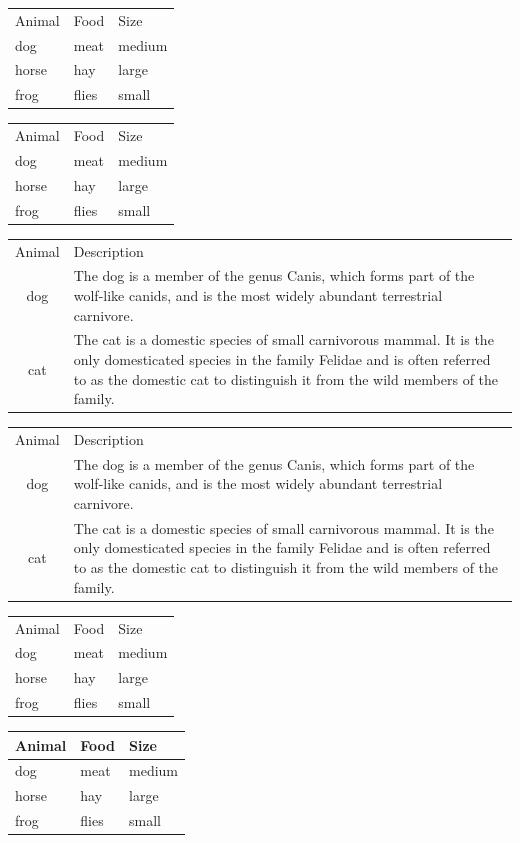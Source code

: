 \documentclass{article}
\begin{document}
\begin{tabular}{lll}
Animal & Food & Size \\
dog & meat & medium \\
horse & hay & large \\
frog & flies & small \\
\end{tabular}

\begin{tabular}{lBl}
Animal & Food & Size \\
dog & meat & medium \\
horse & hay & large \\
frog & flies & small \\
\end{tabular}

\begin{tabular}{cl}
Animal & Description \\
dog & The dog is a member of the genus Canis, which forms
part of the wolf-like canids, and is the most widely abundant
terrestrial carnivore. \\
cat & The cat is a domestic species of small carnivorous
mammal. It is the only domesticated species in the family Felidae and
is often referred to as the domestic cat to distinguish it from the
wild members of the family. \\
\end{tabular}

\begin{tabular}{cp{9cm}}
Animal & Description \\
dog & The dog is a member of the genus Canis, which forms
part of the wolf-like canids, and is the most widely abundant
terrestrial carnivore. \\
cat & The cat is a domestic species of small carnivorous
mammal. It is the only domesticated species in the family Felidae and
is often referred to as the domestic cat to distinguish it from the
wild members of the family. \\
\end{tabular}

\begin{tabular}{*{3}{l}}
Animal & Food & Size \\
dog & meat & medium \\
horse & hay & large \\
frog & flies & small \\
\end{tabular}

\begin{tabular}{lll}
\toprule
Animal & Food & Size \\
\midrule
dog & meat & medium \\
horse & hay & large \\
frog & flies & small \\
\bottomrule
\end{tabular}
\end{document}
